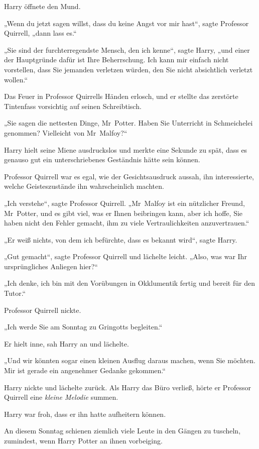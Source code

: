 {Harry öffnete den Mund.

„Wenn du jetzt sagen willst, dass du keine Angst vor mir hast“, sagte Professor Quirrell, „dann lass es.“

„Sie sind der furchterregendste Mensch, den ich kenne“, sagte Harry, „und einer der Hauptgründe dafür ist Ihre Beherrschung. Ich kann mir einfach nicht vorstellen, dass Sie jemanden verletzen würden, den Sie nicht absichtlich verletzt wollen.“

Das Feuer in Professor Quirrells Händen erlosch, und er stellte das zerstörte Tintenfass vorsichtig auf seinen Schreibtisch.

„Sie sagen die nettesten Dinge, Mr~Potter. Haben Sie Unterricht in Schmeichelei genommen? Vielleicht von Mr~Malfoy?“

Harry hielt seine Miene ausdruckslos und merkte eine Sekunde zu spät, dass es genauso gut ein unterschriebenes Geständnis hätte sein können.

Professor Quirrell war es egal, wie der Gesichtsausdruck aussah, ihn interessierte, welche Geisteszustände ihn wahrscheinlich machten.

„Ich verstehe“, sagte Professor Quirrell. „Mr~Malfoy ist ein nützlicher Freund, Mr~Potter, und es gibt viel, was er Ihnen beibringen kann, aber ich hoffe, Sie haben nicht den Fehler gemacht, ihm zu viele Vertraulichkeiten anzuvertrauen.“

„Er weiß nichts, von dem ich befürchte, dass es bekannt wird“, sagte Harry.

„Gut gemacht“, sagte Professor Quirrell und lächelte leicht. „Also, was war Ihr ursprüngliches Anliegen hier?“

„Ich denke, ich bin mit den Vorübungen in Okklumentik fertig und bereit für den Tutor.“

Professor Quirrell nickte.

„Ich werde Sie am Sonntag zu Gringotts begleiten.“

Er hielt inne, sah Harry an und lächelte.

„Und wir könnten sogar einen kleinen Ausflug daraus machen, wenn Sie möchten. Mir ist gerade ein angenehmer Gedanke gekommen.“

Harry nickte und lächelte zurück. Als Harry das Büro verließ, hörte er Professor Quirrell eine \emph{kleine Melodie} summen.

Harry war froh, dass er ihn hatte aufheitern können.

An diesem Sonntag schienen ziemlich viele Leute in den Gängen zu tuscheln, zumindest, wenn Harry Potter an ihnen vorbeiging.

}
